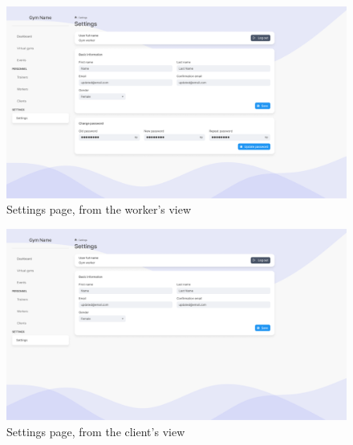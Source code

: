 \documentclass[a4paper, 12pt, oneside]{book}
\begin{document}
\begin{figure}[H]
	\centering
	\includegraphics[width=\textwidth]{assets/ui/Worker.png}
	\caption{Settings page, from the worker's view}
\end{figure}
\begin{figure}[H]
	\centering
	\includegraphics[width=\textwidth]{assets/ui/Client.png}
	\caption{Settings page, from the client's view}
\end{figure}
\end{document}
